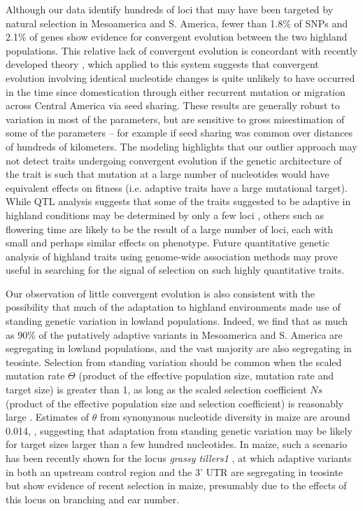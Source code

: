 Although our data identify hundreds of loci that may have been targeted by natural selection in Mesoamerica and S. America, 
fewer than 1.8\% of SNPs and 2.1\% of genes show evidence for convergent evolution between the two highland populations.
This relative lack of convergent evolution is concordant with recently developed theory \citep{ralph2014convergent},
which applied to this system suggests that convergent evolution involving identical nucleotide changes 
is quite unlikely to have occurred in the time since domestication through either recurrent mutation or migration across Central America via seed sharing.   
These results are generally robust to variation in most of the parameters, but are sensitive to gross misestimation of some of the parameters -- for example if seed sharing was common over distances of hundreds of kilometers.  
The modeling highlights that our outlier approach may not detect traits undergoing convergent evolution 
if the genetic architecture of the trait is such that mutation at a large number of nucleotides would have equivalent effects on fitness 
(i.e. adaptive traits have a large mutational target). 
While QTL analysis suggests that some of the traits suggested to be adaptive in highland conditions may be determined by only a few loci \citep{Lauter_2004_15342532}, 
others such as flowering time \citep{buckler2009genetic} are likely to be the result of a large number of loci, each with small and perhaps similar effects on phenotype.  
Future quantitative genetic analysis of highland traits using genome-wide association methods may prove useful in searching for the signal of selection on such highly quantitative traits. 

Our observation of little convergent evolution is also consistent with the possibility that much of the adaptation to highland environments made use of standing genetic variation in lowland populations. 
Indeed, we find that as much as 90\% of the putatively adaptive variants in Mesoamerica and S. America are segregating in lowland populations, 
and the vast majority are also segregating in teosinte.  
Selection from standing variation should be common when the scaled mutation rate $\Theta$ 
(product of the effective population size, mutation rate and target size) is greater than 1,
as long as the scaled selection coefficient $Ns$ 
(product of the effective population size and selection coefficient) is reasonably large \cite[]{Hermisson_2005_15716498}.
Estimates of $\theta$ from synonymous nucleotide diversity in maize are around 0.014, \citep{Tenaillon_2004_15014173,Wright_2005_15919994,Ross-Ibarra_2009_19153259}, 
suggesting that adaptation from standing genetic variation may be likely for target sizes larger than a few hundred nucleotides.
In maize, such a scenario has been recently shown for the locus \emph{grassy tillers1} \cite[]{Wills_2013_23825971}, at which adaptive variants in both an upstream control region and the 3' UTR are segregating in teosinte but show evidence of recent selection in maize, presumably due to the effects of this locus on branching and ear number.

